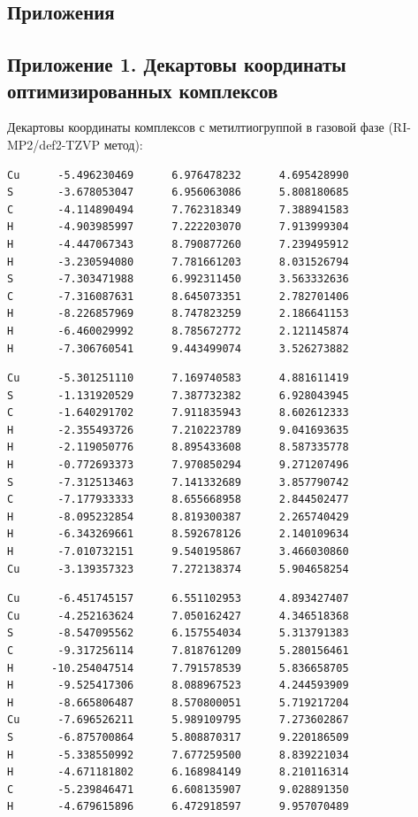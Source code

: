 \documentclass[a4paper,12pt]{article}
\begin{document}
\begin{onehalfspace}
	\section*{Приложения}
	
	\subsection*{Приложение 1. Декартовы координаты оптимизированных комплексов}
	
	Декартовы координаты комплексов с метилтиогруппой в газовой фазе (RI-MP2/def2-TZVP метод):
	
	\setmonofont{Andale Mono}
	\begin{verbatim}
Cu      -5.496230469      6.976478232      4.695428990
S       -3.678053047      6.956063086      5.808180685
C       -4.114890494      7.762318349      7.388941583
H       -4.903985997      7.222203070      7.913999304
H       -4.447067343      8.790877260      7.239495912
H       -3.230594080      7.781661203      8.031526794
S       -7.303471988      6.992311450      3.563332636
C       -7.316087631      8.645073351      2.782701406
H       -8.226857969      8.747823259      2.186641153
H       -6.460029992      8.785672772      2.121145874
H       -7.306760541      9.443499074      3.526273882
	\end{verbatim}
	\begin{verbatim}
Cu      -5.301251110      7.169740583      4.881611419
S       -1.131920529      7.387732382      6.928043945
C       -1.640291702      7.911835943      8.602612333
H       -2.355493726      7.210223789      9.041693635
H       -2.119050776      8.895433608      8.587335778
H       -0.772693373      7.970850294      9.271207496
S       -7.312513463      7.141332689      3.857790742
C       -7.177933333      8.655668958      2.844502477
H       -8.095232854      8.819300387      2.265740429
H       -6.343269661      8.592678126      2.140109634
H       -7.010732151      9.540195867      3.466030860
Cu      -3.139357323      7.272138374      5.904658254
	\end{verbatim}
	\newpage
	\begin{verbatim}
Cu      -6.451745157      6.551102953      4.893427407
Cu      -4.252163624      7.050162427      4.346518368
S       -8.547095562      6.157554034      5.313791383
C       -9.317256114      7.818761209      5.280156461
H      -10.254047514      7.791578539      5.836658705
H       -9.525417306      8.088967523      4.244593909
H       -8.665806487      8.570800051      5.719217204
Cu      -7.696526211      5.989109795      7.273602867
S       -6.875700864      5.808870317      9.220186509
H       -5.338550992      7.677259500      8.839221034
H       -4.671181802      6.168984149      8.210116314
C       -5.239846471      6.608135907      9.028891350
H       -4.679615896      6.472918597      9.957070489


\end{verbatim}
\end{onehalfspace}
\end{document}
